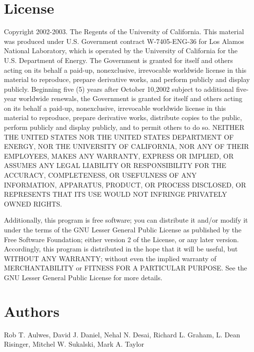 \documentclass[english]{article}
\begin{document}
\section{License}
\begin{description}

Copyright 2002-2003. The Regents of the University of California. This
material was produced under U.S. Government contract W-7405-ENG-36 for
Los Alamos National Laboratory, which is operated by the University of
California for the U.S. Department of Energy. The Government is
granted for itself and others acting on its behalf a paid-up,
nonexclusive, irrevocable worldwide license in this material to
reproduce, prepare derivative works, and perform publicly and display
publicly. Beginning five (5) years after October 10,2002 subject to
additional five-year worldwide renewals, the Government is granted for
itself and others acting on its behalf a paid-up, nonexclusive,
irrevocable worldwide license in this material to reproduce, prepare
derivative works, distribute copies to the public, perform publicly
and display publicly, and to permit others to do so. NEITHER THE
UNITED STATES NOR THE UNITED STATES DEPARTMENT OF ENERGY, NOR THE
UNIVERSITY OF CALIFORNIA, NOR ANY OF THEIR EMPLOYEES, MAKES ANY
WARRANTY, EXPRESS OR IMPLIED, OR ASSUMES ANY LEGAL LIABILITY OR
RESPONSIBILITY FOR THE ACCURACY, COMPLETENESS, OR USEFULNESS OF ANY
INFORMATION, APPARATUS, PRODUCT, OR PROCESS DISCLOSED, OR REPRESENTS
THAT ITS USE WOULD NOT INFRINGE PRIVATELY OWNED RIGHTS.

Additionally, this program is free software; you can distribute it
and/or modify it under the terms of the GNU Lesser General Public
License as published by the Free Software Foundation; either version 2
of the License, or any later version.  Accordingly, this program is
distributed in the hope that it will be useful, but WITHOUT ANY
WARRANTY; without even the implied warranty of MERCHANTABILITY or
FITNESS FOR A PARTICULAR PURPOSE.  See the GNU Lesser General Public
License for more details.

\end{description}

\section{Authors}
\noindent
Rob T. Aulwes, David J. Daniel, Nehal N. Desai, Richard L. Graham, 
L. Dean Risinger, Mitchel W. Sukalski, Mark A. Taylor

\LatexManEnd
\end{document}
